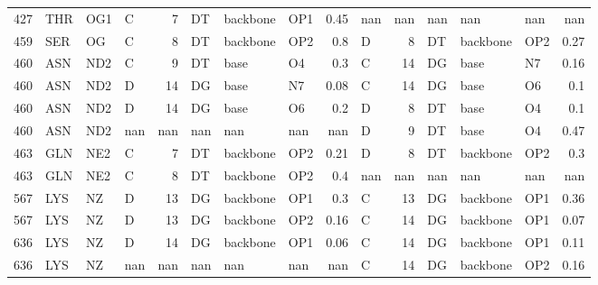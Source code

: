 \begin{longtable}{rlllrlllrlrlllr}
       427 & THR        & OG1    & C         &           7 & DT           & backbone    & OP1      &          0.45 & nan       &         nan & nan          & nan         & nan      &        nan    \\
       459 & SER        & OG     & C         &           8 & DT           & backbone    & OP2      &          0.8  & D         &           8 & DT           & backbone    & OP2      &          0.27 \\
       460 & ASN        & ND2    & C         &           9 & DT           & base        & O4       &          0.3  & C         &          14 & DG           & base        & N7       &          0.16 \\
       460 & ASN        & ND2    & D         &          14 & DG           & base        & N7       &          0.08 & C         &          14 & DG           & base        & O6       &          0.1  \\
       460 & ASN        & ND2    & D         &          14 & DG           & base        & O6       &          0.2  & D         &           8 & DT           & base        & O4       &          0.1  \\
       460 & ASN        & ND2    & nan       &         nan & nan          & nan         & nan      &        nan    & D         &           9 & DT           & base        & O4       &          0.47 \\
       463 & GLN        & NE2    & C         &           7 & DT           & backbone    & OP2      &          0.21 & D         &           8 & DT           & backbone    & OP2      &          0.3  \\
       463 & GLN        & NE2    & C         &           8 & DT           & backbone    & OP2      &          0.4  & nan       &         nan & nan          & nan         & nan      &        nan    \\
       567 & LYS        & NZ     & D         &          13 & DG           & backbone    & OP1      &          0.3  & C         &          13 & DG           & backbone    & OP1      &          0.36 \\
       567 & LYS        & NZ     & D         &          13 & DG           & backbone    & OP2      &          0.16 & C         &          14 & DG           & backbone    & OP1      &          0.07 \\
       636 & LYS        & NZ     & D         &          14 & DG           & backbone    & OP1      &          0.06 & C         &          14 & DG           & backbone    & OP1      &          0.11 \\
       636 & LYS        & NZ     & nan       &         nan & nan          & nan         & nan      &        nan    & C         &          14 & DG           & backbone    & OP2      &          0.16 \\
\hline
\end{longtable}